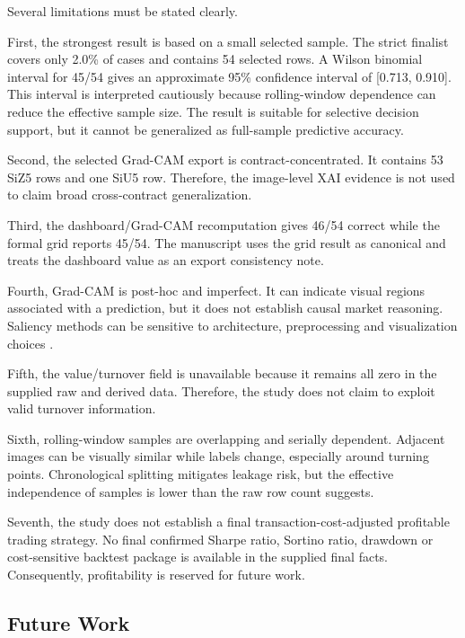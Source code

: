 Several limitations must be stated clearly.

First, the strongest result is based on a small selected sample. The strict finalist covers only 2.0\% of cases and contains 54 selected rows. A Wilson binomial interval for 45/54 gives an approximate 95\% confidence interval of [0.713, 0.910]. This interval is interpreted cautiously because rolling-window dependence can reduce the effective sample size. The result is suitable for selective decision support, but it cannot be generalized as full-sample predictive accuracy.

Second, the selected Grad-CAM export is contract-concentrated. It contains 53 SiZ5 rows and one SiU5 row. Therefore, the image-level XAI evidence is not used to claim broad cross-contract generalization.

Third, the dashboard/Grad-CAM recomputation gives 46/54 correct while the formal grid reports 45/54. The manuscript uses the grid result as canonical and treats the dashboard value as an export consistency note.

Fourth, Grad-CAM is post-hoc and imperfect. It can indicate visual regions associated with a prediction, but it does not establish causal market reasoning. Saliency methods can be sensitive to architecture, preprocessing and visualization choices \cite{adebayo_sanity_checks,arrieta_xai,guidotti_survey}.

Fifth, the value/turnover field is unavailable because it remains all zero in the supplied raw and derived data. Therefore, the study does not claim to exploit valid turnover information.

Sixth, rolling-window samples are overlapping and serially dependent. Adjacent images can be visually similar while labels change, especially around turning points. Chronological splitting mitigates leakage risk, but the effective independence of samples is lower than the raw row count suggests.

Seventh, the study does not establish a final transaction-cost-adjusted profitable trading strategy. No final confirmed Sharpe ratio, Sortino ratio, drawdown or cost-sensitive backtest package is available in the supplied final facts. Consequently, profitability is reserved for future work.

\subsection{Future Work}
\label{subsec:future_work}

